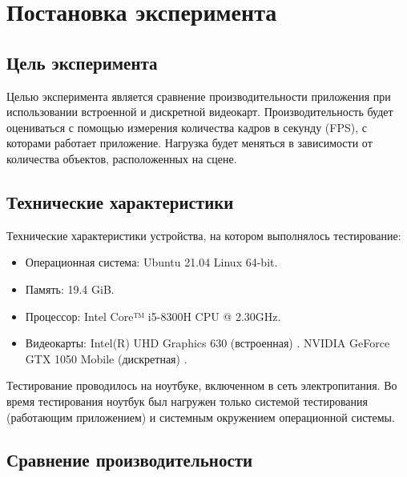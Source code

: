 \section{Постановка эксперимента}
\subsection{Цель эксперимента}

Целью эксперимента является сравнение производительности приложения при использовании встроенной и 
дискретной видеокарт.
Производительность будет оцениваться с помощью измерения количества кадров в секунду (FPS), с которами работает приложение.
Нагрузка будет меняться в зависимости от количества объектов, расположенных на сцене.  

\subsection{Технические характеристики}

Технические характеристики устройства, на котором выполнялось тестирование:

\begin{itemize}
	\item Операционная система: Ubuntu 21.04 \cite{ubuntu} Linux \cite{linux} 64-bit.
	\item Память: 19.4 GiB.
	\item Процессор: Intel Core™ i5-8300H \cite{intel} CPU @ 2.30GHz.
	\item Видеокарты: 
  \subitem Intel(R) UHD Graphics 630 (встроенная) \cite{intel-graphics}.
  \subitem NVIDIA GeForce GTX 1050 Mobile (дискретная) \cite{nvidia-gtx1050m}.
\end{itemize}
Тестирование проводилось на ноутбуке, включенном в сеть электропитания. Во время тестирования ноутбук был нагружен только системой тестирования (работающим приложением) и системным окружением операционной системы.

\subsection{Сравнение производительности}

